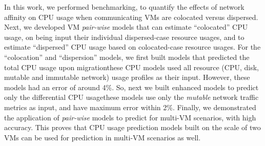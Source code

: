 In this work, we performed benchmarking, to
quantify the effects of network affinity on CPU usage when communicating VMs
are colocated versus dispersed.
Next, we developed VM \textit{pair-wise} models
that can estimate ``colocated'' CPU usage, on being
input their individual dispersed-case resource usages,
and to estimate ``dispersed'' CPU
usage based on colocated-case resource usages.
For the ``colocation'' and ``dispersion'' models, we first
built models that predicted the total CPU usage
upon migration\textemdash{}these CPU models used all resource (CPU, disk, mutable
and immutable network) usage profiles as their input. However, these models
had an error of around 4\%. So, next we built enhanced models
to predict only the differential CPU usage\textemdash{}these
models use only the \textit{mutable} network traffic metrics as input,
and have maximum error within 2\%. Finally, we demonstrated the
application of \textit{pair-wise} models to predict for multi-VM
scenarios, with high accuracy.
This proves that CPU usage prediction models built
on the scale of two VMs can be used for prediction in multi-VM
scenarios as well.


%
%

